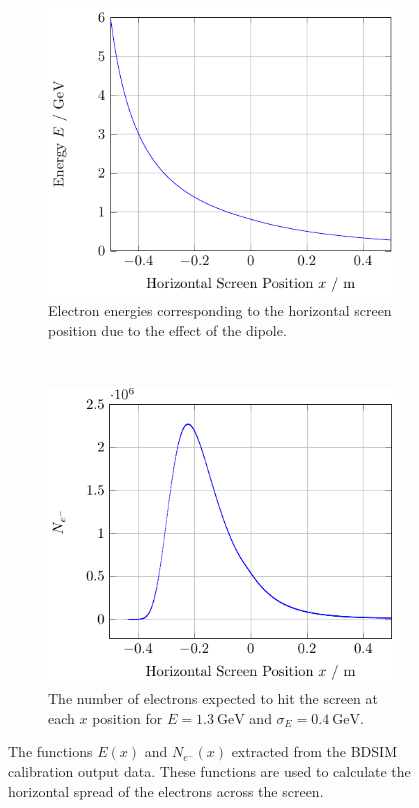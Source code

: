 \begin{figure}[!tb]
	\centering
	\begin{subfigure}[t]{\columnwidth}
		\includegraphics{./figures/eofx.pdf}
		\caption{
			Electron energies corresponding to the horizontal screen position
			due to the effect of the dipole.
		}
		\label{fig:eofx}
	\end{subfigure}\hfill~
	\begin{subfigure}[t]{\columnwidth}
		\includegraphics{./figures/edist.pdf}
		\caption{
			The number of electrons expected to hit the screen at each \(x\)
			position for \(E=\SI{1.3}{\giga\electronvolt}\) and
			\(\sigma_E=\SI{0.4}{\giga\electronvolt}\).
		}
		\label{fig:edist}
	\end{subfigure}
	\caption{
		The functions \(E(x)\) and \(N_{e^-}(x)\) extracted from the BDSIM
		calibration output data. These functions are used to calculate the
		horizontal spread of the electrons across the screen.
	}
\end{figure}


